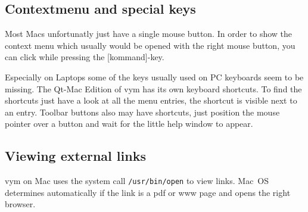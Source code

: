 \documentclass[12pt,a4paper]{article}
\newcommand{\vym}{{\sc vym }}
\newcommand{\key}[1]{[#1]}
\begin{document}
\subsection {Contextmenu and special keys}
Most Macs unfortunatly just have a single mouse button. In order to show
the context menu which usually would be opened with the right mouse
button, you can click while pressing the \key{kommand}-key.

Especially on Laptops some of the keys usually used on PC keyboards seem
to be missing. The Qt-Mac Edition of \vym has its own keyboard
shortcuts. To find the shortcuts just have a look at all the menu
entries, the shortcut is visible next to an entry. Toolbar buttons also
may have shortcuts, just position the mouse pointer over a button and
wait for the little help window to appear. 

\subsection {Viewing external links}
\vym on Mac uses the system call {\tt /usr/bin/open} to view links.
Mac~OS determines automatically if the link is a pdf or www page and
opens the right browser.

\newpage
\end{document}
